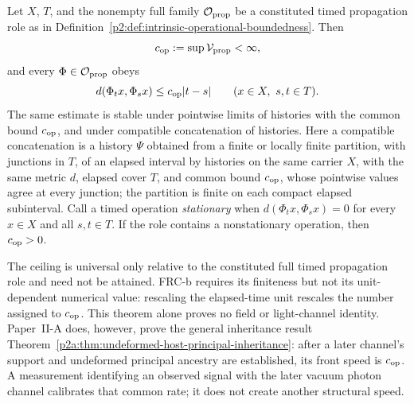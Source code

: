 \documentclass[12pt,a4paper]{article}
\begin{document}
\begin{theorem}
\label{p2:thm:gp1-operational-speed-ceiling}
Let \(X\), \(T\), and the nonempty full family
\(\mathcal O_{\rm prop}\) be a constituted timed
propagation role as in
Definition~\ref{p2:def:intrinsic-operational-boundedness}.  Then
\[
 c_{\rm op}:=\sup\mathcal V_{\rm prop}<\infty,
\]
and every \(\Phi\in\mathcal O_{\rm prop}\) obeys
\begin{equation}
\label{p2:eq:gp1-finite-propagation-cone}
 d(\Phi_t x,\Phi_s x)\le c_{\rm op}|t-s|
 \qquad(x\in X,\ s,t\in T).
\end{equation}
The same estimate is stable under pointwise limits of histories with the
common bound \(c_{\rm op}\), and under compatible concatenation of histories.
Here a compatible concatenation is a history \(\Psi\) obtained from a finite
or locally finite partition, with junctions in \(T\), of an elapsed interval
by histories on the same carrier \(X\), with the same metric \(d\), elapsed
cover \(T\), and common bound \(c_{\rm op}\), whose pointwise values agree at
every junction; the partition is finite on each compact elapsed subinterval.
Call a timed operation \emph{stationary} when \(d(\Phi_tx,\Phi_sx)=0\) for
every \(x\in X\) and all \(s,t\in T\).  If the role contains a nonstationary
operation, then \(c_{\rm op}>0\).

The ceiling is universal only relative to the constituted full timed
propagation role and need not be attained.  FRC-b requires its finiteness but
not its unit-dependent numerical value: rescaling the elapsed-time unit
rescales the number assigned to \(c_{\rm op}\).  This theorem alone proves no
field or light-channel identity.  Paper~II-A does, however, prove the general
inheritance result
Theorem~\ref{p2a:thm:undeformed-host-principal-inheritance}: after a later
channel's support and undeformed principal ancestry are established, its
front speed is \(c_{\rm op}\).  A measurement identifying an observed signal
with the later vacuum photon channel calibrates that common rate; it does not
create another structural speed.
\end{theorem}
\end{document}
